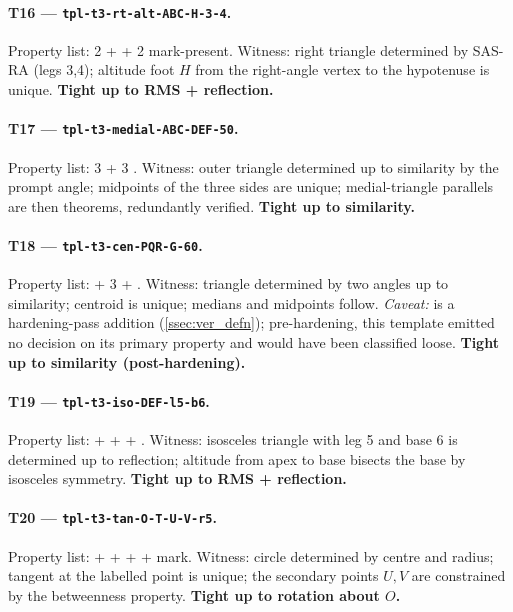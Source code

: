 \paragraph{T16 --- \texttt{tpl-t3-rt-alt-ABC-H-3-4}.}
Property list: 2  +  + 2 mark-present.
Witness: right triangle determined by SAS-RA (legs 3,4); altitude foot $H$ from the right-angle vertex to the hypotenuse is unique.
\textbf{Tight up to RMS + reflection.}

\paragraph{T17 --- \texttt{tpl-t3-medial-ABC-DEF-50}.}
Property list: 3  + 3 .
Witness: outer triangle determined up to similarity by the prompt angle; midpoints of the three sides are unique; medial-triangle parallels are then theorems, redundantly verified.
\textbf{Tight up to similarity.}

\paragraph{T18 --- \texttt{tpl-t3-cen-PQR-G-60}.}
Property list:  + 3  + .
Witness: triangle determined by two angles up to similarity; centroid is unique; medians and midpoints follow.
\emph{Caveat:}  is a hardening-pass addition (\cref{ssec:ver_defn}); pre-hardening, this template emitted no decision on its primary property and would have been classified loose.
\textbf{Tight up to similarity (post-hardening).}

\paragraph{T19 --- \texttt{tpl-t3-iso-DEF-l5-b6}.}
Property list:  +  +  + .
Witness: isosceles triangle with leg 5 and base 6 is determined up to reflection; altitude from apex to base bisects the base by isosceles symmetry.
\textbf{Tight up to RMS + reflection.}

\paragraph{T20 --- \texttt{tpl-t3-tan-O-T-U-V-r5}.}
Property list:  +  +  +  + mark.
Witness: circle determined by centre and radius; tangent at the labelled point is unique; the secondary points $U, V$ are constrained by the betweenness property.
\textbf{Tight up to rotation about $O$.}

